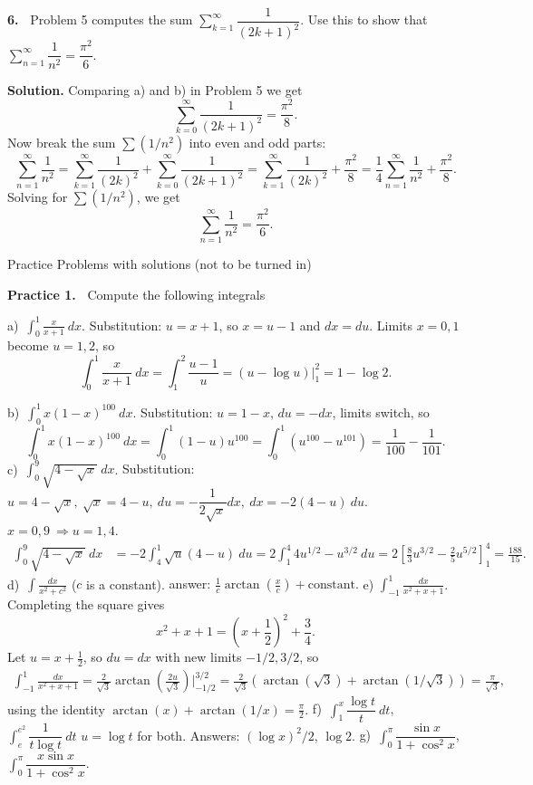 \documentclass[12pt]{article}
\theoremstyle{definition}
\theoremstyle{remark}
\theoremstyle{definition}
\newenvironment{Solution}{\noindent\textbf{Solution.}}{}
\begin{document}
{\bf 6.\ } Problem 5 computes the sum 
$\sum\limits_{k=1}^\infty\dfrac{1}{(2k+1)^2}$. Use this to show that 
$\sum\limits_{n=1}^\infty\dfrac{1}{n^2}=\dfrac{\pi^2}{6}.$

\begin{Solution}
Comparing a) and b) in Problem 5 we get
\[\sum\limits_{k=0}^\infty\dfrac{1}{(2k+1)^2}=\frac{\pi^2}{8}.\]
Now break the sum $\sum(1/n^2)$ into even and odd parts: 
\[\sum\limits_{n=1}^\infty\dfrac{1}{n^2}=
\sum\limits_{k=1}^\infty\dfrac{1}{(2k)^2}+
\sum\limits_{k=0}^\infty\dfrac{1}{(2k+1)^2}
=
\sum\limits_{k=1}^\infty\dfrac{1}{(2k)^2}+\frac{\pi^2}{8}
=\frac{1}{4}\sum\limits_{n=1}^\infty\dfrac{1}{n^2}+\frac{\pi^2}{8}.
\]
Solving for $\sum(1/n^2)$, we get
\[\sum\limits_{n=1}^\infty\dfrac{1}{n^2}=\frac{\pi^2}{6}.
\]
\end{Solution}

\newpage
Practice Problems with solutions (not to be turned in)

{\bf Practice 1.\ }  Compute the following integrals

a)\ $\displaystyle\int_0^1\frac{x}{x+1}\ dx$.
\vskip10pt
{\small Substitution: $u=x+1$, so $x=u-1$ and $dx=du$. Limits $x=0,1$ become $u=1,2$, so 
\[\int_0^1\frac{x}{x+1}\ dx=\int_1^2\frac{u-1}{u}=(u-\log u)\Big\vert_1^2=1-\log 2.\]
}

b)\  $\displaystyle\int_0^1x(1-x)^{100}\ dx$.
\vskip10pt
{\small Substitution: $u=1-x$, $du=-dx$, limits switch, so 
\[\int_0^1x(1-x)^{100}\ dx=\int_0^1(1-u)u^{100}=\int_0^1(u^{100}-u^{101})=\frac{1}{100}-\frac{1}{101}.\]
}
c)\ $\displaystyle\int_0^9\sqrt{4-\sqrt{x}}\ dx$. 
\vskip10pt
{\small 
Substitution: $u=4-\sqrt{x},\ \sqrt{x}=4-u,\ du=-\dfrac{1}{2\sqrt{x}} dx,\ dx=-2(4-u)\ du$. $x=0,9\ \Rightarrow u=1,4$. \[\begin{split}\int_0^9\sqrt{4-\sqrt{x}}\ dx
&= -2\int_4^1\sqrt{u}(4-u)\ du=2\int_1^4 4u^{1/2}-u^{3/2}\ du=
2\left[\frac{8}{3}u^{3/2}-\frac{2}{5}u^{5/2}\right]_1^4
=\frac{188}{15}.
\end{split}
\]
}
\vskip10pt
d)\ $\displaystyle\int \frac{dx}{x^2+c^2}$ \quad ($c$ is a constant). 
\vskip10pt
{\small answer: $\frac{1}{c}\arctan\left(\frac{x}{c}\right)+\text{constant}$.
}
\vskip10pt
e) $\displaystyle\int_{-1}^1\frac{dx}{x^2+x+1}$.
\vskip10pt
{\small 
Completing the square gives 
\[x^2+x+1=\left(x+\frac{1}{2}\right)^2+\frac{3}{4}.\]
Let $u=x+\frac{1}{2}$, so $du=dx$ with new limits $-1/2, 3/2$, so 
\[\begin{split}
\int_{-1}^1\frac{dx}{x^2+x+1}
=\frac{2}{\sqrt{3}}
\arctan\left(\frac{2u}{\sqrt{3}}\right)\Big\vert_{-1/2}^{3/2}
=\frac{2}{\sqrt{3}}\left(\arctan(\sqrt{3})+\arctan(1/\sqrt{3})\right)
=\frac{\pi}{\sqrt{3}},
\end{split}
\]
using the identity $\arctan(x)+\arctan(1/x)=\frac{\pi}{2}$. }
\vskip10pt
f)\ $\displaystyle\int_{1}^x\dfrac{\log t}{t}\ dt$, \qquad
$\displaystyle\int_{e}^{e^2}\dfrac{1}{t\log t}\ dt$\qquad
{\small $u=\log t$ for both. Answers: $(\log x)^2/2$, \quad $\log 2$. }
\vskip10pt
g)\ $\displaystyle\int_{0}^\pi\dfrac{\sin x}{1+\cos^2 x}$,\qquad 
$\displaystyle\int_{0}^\pi\dfrac{x\sin x}{1+\cos^2 x}$.
\end{document}

